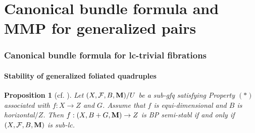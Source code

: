 \documentclass[11pt]{amsart}
\numberwithin{equation}{section}
\newcommand{\Mm}{{\bf{M}}}
\newcommand{\Ff}{\mathcal{F}}
\newtheorem{prop}[thm]{Proposition}
\theoremstyle{definition}
\theoremstyle{definition}
\theoremstyle{definition}
\begin{document}
\part{Canonical bundle formula and MMP for generalized pairs}\label{part:cbf}

\section{Canonical bundle formula for lc-trivial fibrations}\label{sec: cbf}

\subsection{Stability of generalized foliated quadruples}\label{subsec: stability gfq}

\begin{prop}[{cf. \cite[Proposition 3.7]{ACSS21}}]\label{prop: bp semistable foliation lc}
    Let $(X,\Ff,B,\Mm)/U$ be a sub-gfq satisfying Property $(*)$ associated with $f: X\rightarrow Z$ and $G$. Assume that $f$ is equi-dimensional and $B$ is horizontal$/Z$. Then $f: (X,B+G,\Mm)\rightarrow Z$ is BP semi-stabl if and only if $(X,\Ff,B,\Mm)$ is sub-lc.
\end{prop}
\end{document}
